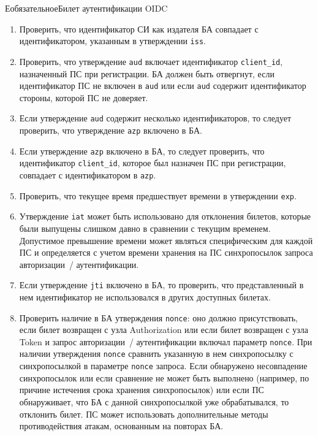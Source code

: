 \begin{appendix}{Е}{обязательное}{Билет аутентификации OIDC}
\begin{enumerate}
\item  
Проверить, что идентификатор СИ как издателя БА совпадает с идентификатором, 
указанным в утверждении \lstinline{iss}.

\item 
Проверить, что утверждение \lstinline{aud} включает идентификатор 
\lstinline{client_id}, назначенный ПС при регистрации.
%
БА должен быть отвергнут, если идентификатор ПС не включен в \lstinline{aud}
или если \lstinline{aud} содержит идентификатор стороны, которой ПС не 
доверяет. 

\item 
Если утверждение \lstinline{aud} содержит несколько идентификаторов, 
то следует проверить, что утверждение \lstinline{azp} включено в БА. 

\item  
Если утверждение \lstinline{azp} включено в БА, то следует проверить, 
что идентификатор \lstinline{client_id}, которое был назначен ПС при 
регистрации, совпадает с идентификатором в \lstinline{azp}.

\item 
Проверить, что текущее время предшествует времени в утверждении 
\lstinline{exp}. 

\item 
Утверждение \lstinline{iat} может быть использовано для отклонения
билетов, которые были выпущены слишком давно в сравнении с текущим временем.
Допустимое превышение времени может являться специфическим 
для каждой ПС и определяется с учетом времени хранения на ПС синхропосылок 
запроса авторизации~/ аутентификации.

\item
Если утверждение \lstinline{jti} включено в БА, то проверить, что 
представленный в нем идентификатор не использовался в других доступных
билетах.

\item 
Проверить наличие в БА утверждения \lstinline{nonce}: оно должно 
присутствовать, если билет возвращен с узла Authorization или если билет 
возвращен с узла Token и запрос авторизации~/ аутентификации включал параметр 
\lstinline{nonce}.
%
При наличии утверждения \lstinline{nonce} сравнить указанную в нем 
синхропосылку с синхропосылкой в параметре \lstinline{nonce} запроса.
%
Если обнаружено несовпадение синхропосылок или если сравнение не может быть 
выполнено (например, по причине истечения срока хранения синхропосылок) или если
ПС обнаруживает, что БА с данной синхропосылкой уже обрабатывался, 
то отклонить билет.
%
ПС может использовать дополнительные методы противодействия атакам, основанным 
на повторах БА. 


\end{enumerate}
\end{appendix}
